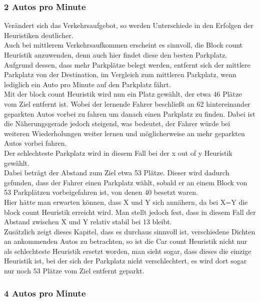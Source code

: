 \subsubsection{2 Autos pro Minute}

Verändert sich das Verkehrsaufgebot, so werden Unterschiede in den Erfolgen der Heuristiken deutlicher.\\
Auch bei mittlerem Verkehrsaufkommen erscheint es sinnvoll, die Block count Heuristik anzuwenden, denn auch hier findet diese den besten Parkplatz.
Aufgrund dessen, dass mehr Parkplätze belegt werden, entfernt sich der mittlere Parkplatz von der Destination, im Vergleich zum mittleren Parkplatz, wenn lediglich ein Auto pro Minute auf den Parkplatz fährt.\\
Mit der block count Heuristik wird nun ein Platz gewählt, der etwa 46 Plätze vom Ziel entfernt ist. Wobei der lernende Fahrer beschließt an 62 hintereinander geparkten Autos vorbei zu fahren um danach einen Parkplatz zu finden. Dabei ist die Näherungsgerade jedoch steigend, was bedeutet, der Fahrer würde bei weiteren Wiederholungen weiter lernen und möglicherweise an mehr geparkten Autos vorbei fahren.\\
Der schlechteste Parkplatz wird in diesem Fall bei der  x out of y Heuristik gewählt. \\
Dabei beträgt der Abstand zum Ziel etwa 53 Plätze. Dieser wird dadurch gefunden, dass der Fahrer einen Parkplatz wählt, sobald er an einem Block von 53 Parkplätzen vorbeigefahren ist, von denen 40 besetzt waren.\\
Hier hätte man erwarten können, dass X und Y sich annähern, da bei X=Y die block count Heuristik erreicht wird. Man stellt jedoch fest, dass in diesem Fall der Abstand zwischen X und Y relativ stabil bei 13 bleibt.\\
Zusätzlich zeigt dieses Kapitel, dass es durchaus sinnvoll ist, verschiedene Dichten an ankommenden Autos zu betrachten, so ist die Car count Heuristik nicht nur als schlechteste Heuristik ersetzt worden, man sieht sogar, dass dieses die einzige Heuristik ist, bei der sich der Parkplatz nicht verschlechtert, es wird dort sogar nur noch 53 Plätze vom Ziel entfernt geparkt.

\subsubsection{4 Autos pro Minute} 

